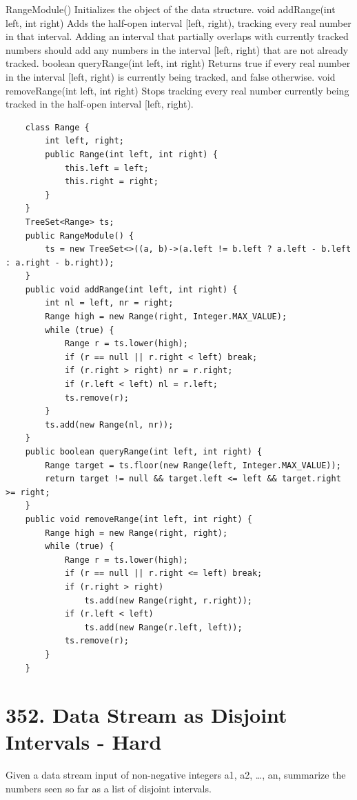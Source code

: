 \documentclass[9pt, b5paaper]{book}
\begin{document}
RangeModule() Initializes the object of the data structure.
void addRange(int left, int right) Adds the half-open interval [left, right), tracking every real number in that interval. Adding an interval that partially overlaps with currently tracked numbers should add any numbers in the interval [left, right) that are not already tracked.
boolean queryRange(int left, int right) Returns true if every real number in the interval [left, right) is currently being tracked, and false otherwise.
void removeRange(int left, int right) Stops tracking every real number currently being tracked in the half-open interval [left, right).
\begin{verbatim}
    class Range {
        int left, right;
        public Range(int left, int right) {
            this.left = left;
            this.right = right;
        }
    }
    TreeSet<Range> ts;
    public RangeModule() {
        ts = new TreeSet<>((a, b)->(a.left != b.left ? a.left - b.left : a.right - b.right));
    }
    public void addRange(int left, int right) {
        int nl = left, nr = right;
        Range high = new Range(right, Integer.MAX_VALUE);
        while (true) {
            Range r = ts.lower(high);
            if (r == null || r.right < left) break;
            if (r.right > right) nr = r.right;
            if (r.left < left) nl = r.left;
            ts.remove(r);
        }
        ts.add(new Range(nl, nr));
    }
    public boolean queryRange(int left, int right) {
        Range target = ts.floor(new Range(left, Integer.MAX_VALUE));
        return target != null && target.left <= left && target.right >= right;
    }
    public void removeRange(int left, int right) {
        Range high = new Range(right, right);
        while (true) {
            Range r = ts.lower(high);
            if (r == null || r.right <= left) break;
            if (r.right > right)
                ts.add(new Range(right, r.right));
            if (r.left < left)
                ts.add(new Range(r.left, left));
            ts.remove(r);
        }
    }
\end{verbatim}

\section{352. Data Stream as Disjoint Intervals - Hard}
\label{sec-19-3}
Given a data stream input of non-negative integers a1, a2, \ldots{}, an, summarize the numbers seen so far as a list of disjoint intervals.
\end{document}
